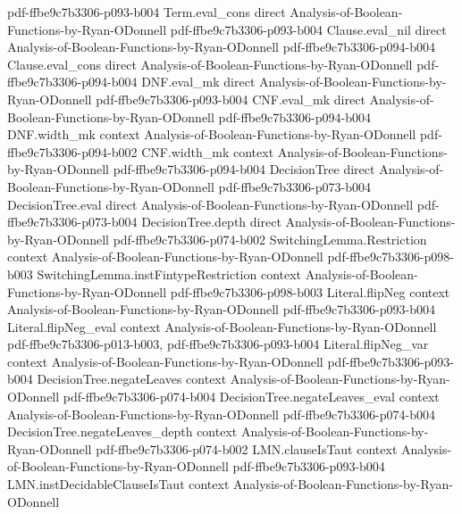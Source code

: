 \begin{theorem}
  {pdf-ffbe9c7b3306-p093-b004}
\proofstep
  {Term.eval_cons}
  {direct}
  {Analysis-of-Boolean-Functions-by-Ryan-ODonnell}
  {pdf-ffbe9c7b3306-p093-b004}
\proofstep
  {Clause.eval_nil}
  {direct}
  {Analysis-of-Boolean-Functions-by-Ryan-ODonnell}
  {pdf-ffbe9c7b3306-p094-b004}
\proofstep
  {Clause.eval_cons}
  {direct}
  {Analysis-of-Boolean-Functions-by-Ryan-ODonnell}
  {pdf-ffbe9c7b3306-p094-b004}
\proofstep
  {DNF.eval_mk}
  {direct}
  {Analysis-of-Boolean-Functions-by-Ryan-ODonnell}
  {pdf-ffbe9c7b3306-p093-b004}
\proofstep
  {CNF.eval_mk}
  {direct}
  {Analysis-of-Boolean-Functions-by-Ryan-ODonnell}
  {pdf-ffbe9c7b3306-p094-b004}
\proofstep
  {DNF.width_mk}
  {context}
  {Analysis-of-Boolean-Functions-by-Ryan-ODonnell}
  {pdf-ffbe9c7b3306-p094-b002}
\proofstep
  {CNF.width_mk}
  {context}
  {Analysis-of-Boolean-Functions-by-Ryan-ODonnell}
  {pdf-ffbe9c7b3306-p094-b004}
\proofstep
  {DecisionTree}
  {direct}
  {Analysis-of-Boolean-Functions-by-Ryan-ODonnell}
  {pdf-ffbe9c7b3306-p073-b004}
\proofstep
  {DecisionTree.eval}
  {direct}
  {Analysis-of-Boolean-Functions-by-Ryan-ODonnell}
  {pdf-ffbe9c7b3306-p073-b004}
\proofstep
  {DecisionTree.depth}
  {direct}
  {Analysis-of-Boolean-Functions-by-Ryan-ODonnell}
  {pdf-ffbe9c7b3306-p074-b002}
\proofstep
  {SwitchingLemma.Restriction}
  {context}
  {Analysis-of-Boolean-Functions-by-Ryan-ODonnell}
  {pdf-ffbe9c7b3306-p098-b003}
\proofstep
  {SwitchingLemma.instFintypeRestriction}
  {context}
  {Analysis-of-Boolean-Functions-by-Ryan-ODonnell}
  {pdf-ffbe9c7b3306-p098-b003}
\proofstep
  {Literal.flipNeg}
  {context}
  {Analysis-of-Boolean-Functions-by-Ryan-ODonnell}
  {pdf-ffbe9c7b3306-p093-b004}
\proofstep
  {Literal.flipNeg_eval}
  {context}
  {Analysis-of-Boolean-Functions-by-Ryan-ODonnell}
  {pdf-ffbe9c7b3306-p013-b003,
    pdf-ffbe9c7b3306-p093-b004}
\proofstep
  {Literal.flipNeg_var}
  {context}
  {Analysis-of-Boolean-Functions-by-Ryan-ODonnell}
  {pdf-ffbe9c7b3306-p093-b004}
\proofstep
  {DecisionTree.negateLeaves}
  {context}
  {Analysis-of-Boolean-Functions-by-Ryan-ODonnell}
  {pdf-ffbe9c7b3306-p074-b004}
\proofstep
  {DecisionTree.negateLeaves_eval}
  {context}
  {Analysis-of-Boolean-Functions-by-Ryan-ODonnell}
  {pdf-ffbe9c7b3306-p074-b004}
\proofstep
  {DecisionTree.negateLeaves_depth}
  {context}
  {Analysis-of-Boolean-Functions-by-Ryan-ODonnell}
  {pdf-ffbe9c7b3306-p074-b002}
\proofstep
  {LMN.clauseIsTaut}
  {context}
  {Analysis-of-Boolean-Functions-by-Ryan-ODonnell}
  {pdf-ffbe9c7b3306-p093-b004}
\proofstep
  {LMN.instDecidableClauseIsTaut}
  {context}
  {Analysis-of-Boolean-Functions-by-Ryan-ODonnell}

\end{theorem}
